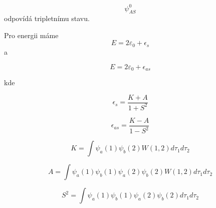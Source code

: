 \documentclass[../main.tex]{subfiles}
\begin{document}
\begin{equation}
    \psi^0_{AS}
\end{equation}
odpovídá tripletnímu stavu. 


Pro energii máme 
\begin{equation}
    E = 2 \varepsilon_0 + \epsilon_s
\end{equation}
a 

\begin{equation}
    E = 2 \varepsilon_0 + \epsilon_{as}
\end{equation}

kde 

\begin{equation}
    \epsilon_s = \frac{K+A}{1+S^2}
\end{equation}

\begin{equation}
    \epsilon_{as} = \frac{K - A}{1 - S^2}
\end{equation}

\begin{equation}
    K = \int \psi_a(1) \psi_b(2)W(1,2) d\tau_1 d\tau_2
\end{equation}

\begin{equation}
    A = \int \psi_a(1) \psi_b(1) \psi_a(2) \psi_b(2)W(1,2) d\tau_1 d\tau_2
\end{equation}

\begin{equation}
    S^2 = \int \psi_a(1) \psi_b(1)\psi_a(2) \psi_b(2) d\tau_1 d\tau_2
\end{equation}
\end{document}
